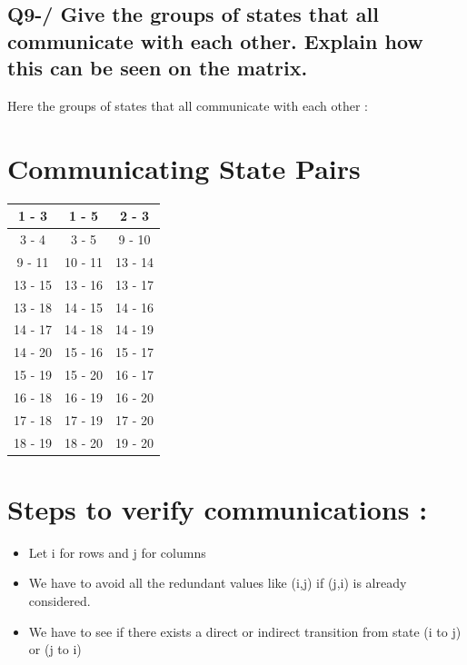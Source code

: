 \documentclass{article}
\begin{document}
    \subsection*{Q9-/ Give the groups of states that all communicate with each other.
    Explain how this can be seen on the matrix.}
    Here the groups of states that all communicate with each other :
    \section*{Communicating State Pairs}
    \begin{center}

        \begin{tabular}{|c|c|c|}
            \hline
            1 - 3  & 1 - 5  & 2 - 3  \\ \hline
            3 - 4  & 3 - 5  & 9 - 10 \\ \hline
            9 - 11 & 10 - 11 & 13 - 14 \\ \hline
            13 - 15 & 13 - 16 & 13 - 17 \\ \hline
            13 - 18 & 14 - 15 & 14 - 16 \\ \hline
            14 - 17 & 14 - 18 & 14 - 19 \\ \hline
            14 - 20 & 15 - 16 & 15 - 17 \\ \hline
            15 - 19 & 15 - 20 & 16 - 17 \\ \hline
            16 - 18 & 16 - 19 & 16 - 20 \\ \hline
            17 - 18 & 17 - 19 & 17 - 20 \\ \hline
            18 - 19 & 18 - 20 & 19 - 20 \\ \hline
        \end{tabular}
    \end{center}

    \section*{Steps to verify communications :}
    \begin{itemize}
        \item Let i for rows and j for columns
        \item We have to avoid all the redundant values like (i,j) if (j,i) is already considered.
        \item We have to see if there exists a direct or indirect transition from state (i to j) or (j to i)

    \end{itemize}
\end{document}
